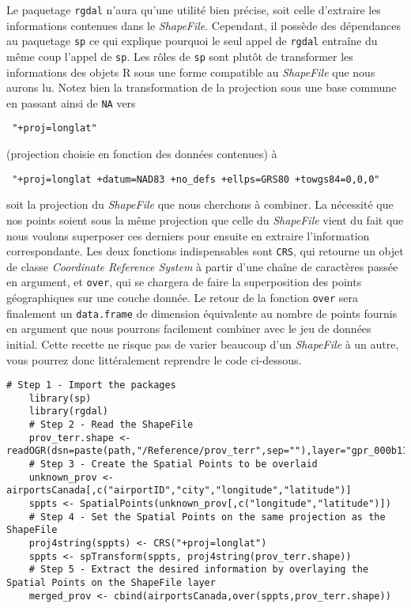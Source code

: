 Le paquetage \texttt{rgdal} n'aura qu'une utilité bien précise, soit celle d'extraire les informations contenues dans le \emph{ShapeFile}. Cependant, il possède des dépendances au paquetage \texttt{sp} ce qui explique pourquoi le seul appel de \texttt{rgdal} entraîne du même coup l'appel de \texttt{sp}. Les rôles de \texttt{sp} sont plutôt de transformer les informations des objets R sous une forme compatible au \emph{ShapeFile} que nous aurons lu. Notez bien la transformation de la projection sous une base commune en passant ainsi de \texttt{NA} vers \begin{verbatim} "+proj=longlat" \end{verbatim} (projection choisie en fonction des données contenues) à \begin{verbatim} "+proj=longlat +datum=NAD83 +no_defs +ellps=GRS80 +towgs84=0,0,0" \end{verbatim} soit la projection du \emph{ShapeFile} que nous cherchons à combiner. La nécessité que nos points soient sous la même projection que celle du \emph{ShapeFile} vient du fait que nous voulons superposer ces derniers pour ensuite en extraire l'information correspondante. Les deux fonctions indispensables sont \texttt{CRS}, qui retourne un objet de classe \emph{Coordinate Reference System} à partir d'une chaîne de caractères passée en argument, et \texttt{over}, qui se chargera de faire la superposition des points géographiques sur une couche donnée. Le retour de la fonction \texttt{over} sera finalement un \texttt{data.frame} de dimension équivalente au nombre de points fournis en argument que nous pourrons facilement combiner avec le jeu de données initial. Cette recette ne risque pas de varier beaucoup d'un \emph{ShapeFile} à un autre, vous pourrez donc littéralement reprendre le code ci-dessous. \\

\begin{lstlisting}[caption = Traitement standard de données géospatiales en R,label=src:GeoDataR]
	# Step 1 - Import the packages	
	library(sp)
	library(rgdal)
	# Step 2 - Read the ShapeFile
	prov_terr.shape <- readOGR(dsn=paste(path,"/Reference/prov_terr",sep=""),layer="gpr_000b11a_e")
	# Step 3 - Create the Spatial Points to be overlaid
	unknown_prov <- airportsCanada[,c("airportID","city","longitude","latitude")]
	sppts <- SpatialPoints(unknown_prov[,c("longitude","latitude")])
	# Step 4 - Set the Spatial Points on the same projection as the ShapeFile
	proj4string(sppts) <- CRS("+proj=longlat")
	sppts <- spTransform(sppts, proj4string(prov_terr.shape))
	# Step 5 - Extract the desired information by overlaying the Spatial Points on the ShapeFile layer
	merged_prov <- cbind(airportsCanada,over(sppts,prov_terr.shape))
\end{lstlisting}


